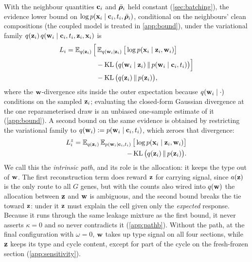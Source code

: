 With the neighbour quantities $\mathbf{c}_i$ and $\bar{\boldsymbol{\rho}}_i$ held constant (\cref{sec:batching}), the evidence lower bound on $\log p(\mathbf{x}_i \mid \mathbf{c}_i, t_i, \bar{\boldsymbol{\rho}}_i)$, conditional on the neighbours' clean compositions (the coupled model is treated in \cref{app:bound}), under the variational family $q(\mathbf{z}_i)\, q(\mathbf{w}_i \mid \mathbf{c}_i, t_i, \mathbf{z}_i, \mathbf{x}_i)$ is
\begin{equation}
\begin{split}
  L_i = \operatorname{\mathbb{E}}_{q(\mathbf{z}_i)}\Big[&\operatorname{\mathbb{E}}_{q(\mathbf{w}_i \mid \mathbf{z}_i)}\big[\log p(\mathbf{x}_i \mid \mathbf{z}_i, \mathbf{w}_i)\big] \\
  &- \operatorname{KL}\big(q(\mathbf{w}_i \mid \mathbf{z}_i)\,\|\,p(\mathbf{w}_i \mid \mathbf{c}_i, t_i)\big)\Big] \\
  &- \operatorname{KL}\big(q(\mathbf{z}_i)\,\|\,p(\mathbf{z}_i)\big),
\end{split}
\label{eq:bound-a}
\end{equation}
where the $\mathbf{w}$-divergence sits inside the outer expectation because $q(\mathbf{w}_i \mid \cdot)$ conditions on the sampled $\mathbf{z}_i$; evaluating the closed-form Gaussian divergence at the one reparameterised draw is an unbiased one-sample estimate of it (\cref{app:bound}). A second bound on the same evidence is obtained by restricting the variational family to $q(\mathbf{w}_i) := p(\mathbf{w}_i \mid \mathbf{c}_i, t_i)$, which zeroes that divergence:
\begin{equation}
\begin{split}
  L_i^{z} = \operatorname{\mathbb{E}}_{q(\mathbf{z}_i)}\operatorname{\mathbb{E}}_{p(\mathbf{w}_i \mid \mathbf{c}_i, t_i)}\big[\log p(\mathbf{x}_i \mid \mathbf{z}_i, \mathbf{w}_i)\big] \\
  - \operatorname{KL}\big(q(\mathbf{z}_i)\,\|\,p(\mathbf{z}_i)\big).
\end{split}
\label{eq:bound-b}
\end{equation}
We call this the \emph{intrinsic path}, and its role is the allocation: it keeps the type out of $\mathbf{w}$. The first reconstruction term does reward $\mathbf{z}$ for carrying signal, since $a(\mathbf{z})$ is the only route to all $G$ genes, but with the counts also wired into $q(\mathbf{w})$ the allocation between $\mathbf{z}$ and $\mathbf{w}$ is ambiguous, and the second bound breaks the tie toward $\mathbf{z}$: under it $\mathbf{z}$ must explain the cell given only the \emph{expected} response. Because it runs through the same leakage mixture as the first bound, it never asserts $\kappa = 0$ and so never contradicts it (\cref{app:pathb}). Without the path, at the final configuration with $\omega = 0$, $\mathbf{w}$ takes up type signal on all four sections, while $\mathbf{z}$ keeps its type and cycle content, except for part of the cycle on the fresh-frozen section (\cref{app:sensitivity}).

